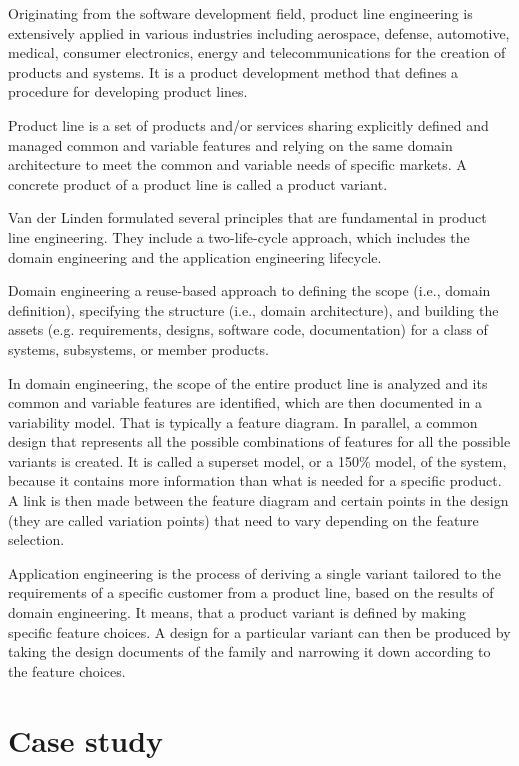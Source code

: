 \documentclass[sigconf,review]{acmart}
\begin{document}
Originating from the software development field, product line engineering is extensively applied in various industries including aerospace, defense, automotive, medical, consumer electronics, energy and telecommunications for the creation of products and systems. 
It is a product development method that defines a procedure for developing product lines. 

Product line is a set of products and/or services sharing explicitly defined and managed common and variable features and relying on the same domain architecture to meet the common and variable needs of specific markets.
A concrete product of a product line is called a product variant.

Van der Linden formulated several principles that are fundamental in product line engineering. They include a two-life-cycle approach, which includes the domain engineering and the application engineering lifecycle.

Domain engineering a reuse-based approach to defining the scope (i.e., domain definition), specifying the structure (i.e., domain architecture), and building the assets (e.g. requirements, designs, software code, documentation) for a class of systems, subsystems, or member products.

In domain engineering, the scope of the entire product line is analyzed and its common and variable features are identified, which are then documented in a variability model. That is typically a feature diagram.
In parallel, a common design that represents all the possible combinations of features for all the possible variants is created. It is called a superset model, or a 150\% model, of the system, because it contains more information than what is needed for a specific product.
A link is then made between the feature diagram and certain points in the design (they are called variation points) that need to vary depending on the feature selection.

Application engineering is the process of deriving a single variant tailored to the requirements of a specific customer from a product line, based on the results of domain engineering. 
It means, that a product variant is defined by making specific feature choices. A design for a particular variant can then be produced by taking the design documents of the family and narrowing it down according to the feature choices.


\section{Case study}
\label{sec:case-study}
\end{document}
